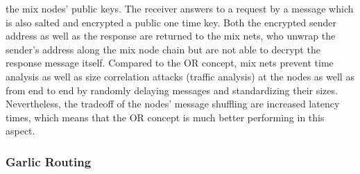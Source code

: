 \documentclass{sig-alternate}
\begin{document}
the mix nodes’ public keys. The receiver answers to a request by a message which is also salted and encrypted a public one time key. Both the encrypted sender address as well as the response are returned to the mix nets, who unwrap the sender’s address along the mix node chain but are not able to decrypt the response message itself. Compared to the OR concept, mix nets prevent time analysis as well as size correlation attacks (traffic analysis) at the nodes as well as from end to end by randomly delaying messages and standardizing their sizes. Nevertheless, the tradeoff of the nodes’ message shuffling are increased latency times, which means that the OR concept is much better performing in this aspect. 

\subsubsection {Garlic Routing}
\end{document}
